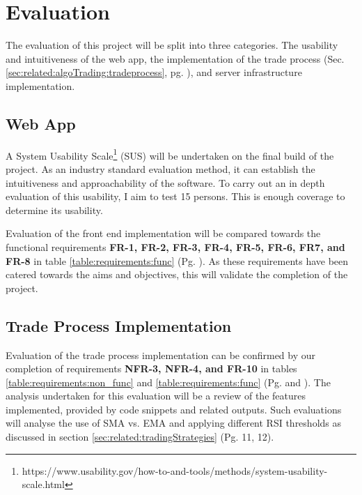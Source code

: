 %
\chapter{Evaluation}
\label{sec:evaluation}

The evaluation of this project will be split into three categories. The usability and intuitiveness of the web app, the implementation of the trade process (Sec. \ref{sec:related:algoTrading:tradeprocess}, pg. \pageref{sec:related:algoTrading:tradeprocess}), and server infrastructure implementation.


\section{Web App}
\label{sec:evaluation:ui}
\noindent A System Usability Scale\footnote{https://www.usability.gov/how-to-and-tools/methods/system-usability-scale.html} (SUS) will be undertaken on the final build of the project. As an industry standard evaluation method, it can establish the intuitiveness and approachability of the software. To carry out an in depth evaluation of this usability, I aim to test 15 persons. This is enough coverage to determine its usability.

Evaluation of the front end implementation will be compared towards the functional requirements \textbf{FR-1, FR-2, FR-3, FR-4, FR-5, FR-6, FR7, and FR-8} in table \ref{table:requirements:func} (Pg. \pageref{table:requirements:func}). As these requirements have been catered towards the aims and objectives, this will validate the completion of the project.


\section{Trade Process Implementation}
\label{sec:evaluation:tradeprocess}
\noindent Evaluation of the trade process implementation can be confirmed by our completion of requirements \textbf{NFR-3, NFR-4, and FR-10} in tables \ref{table:requirements:non_func} and \ref{table:requirements:func} (Pg. \pageref{table:requirements:non_func} and \pageref{table:requirements:func}). The analysis undertaken for this evaluation will be a review of the features implemented, provided by code snippets and related outputs. Such evaluations will analyse the use of SMA vs. EMA and applying different RSI thresholds as discussed in section \ref{sec:related:tradingStrategies} (Pg. 11, 12).



